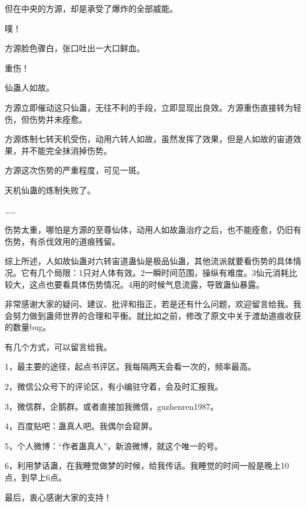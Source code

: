 \begin{this_body}
但在中央的方源，却是承受了爆炸的全部威能。

噗！

方源脸色骤白，张口吐出一大口鲜血。

重伤！

仙蛊人如故。

方源立即催动这只仙蛊，无往不利的手段，立即显现出良效。方源重伤直接转为轻伤，但伤势并未痊愈。

方源炼制七转天机受伤，动用六转人如故，虽然发挥了效果，但是人如故的宙道效果，并不能完全抹消掉伤势。

方源这次伤势的严重程度，可见一斑。

天机仙蛊的炼制失败了。

……

伤势太重，哪怕是方源的至尊仙体，动用人如故蛊治疗之后，也不能痊愈，仍旧有伤势，有杀伐效用的道痕残留。

综上所述，人如故仙蛊对六转宙道蛊仙是极品仙蛊，其他流派就要看伤势的具体情况。它有几个局限：1只对人体有效。2一瞬时间范围，操纵有难度。3仙元消耗比较大，这点也要看具体伤势情况。4用的时候气息流露，导致蛊仙暴露。

非常感谢大家的疑问、建议、批评和指正，若是还有什么问题，欢迎留言给我。我会努力做到蛊师世界的合理和平衡。就比如之前，修改了原文中关于渡劫道痕收获的数量bug。

有几个方式，可以留言给我。

1，最主要的途径，起点书评区。我每隔两天会看一次的，频率最高。

2，微信公众号下的评论区，有小编驻守着，会及时汇报我。

3，微信群，企鹅群。或者直接加我微信，guzhenren1987。

4，百度贴吧：蛊真人吧。我偶尔会窥屏。

5，个人微博：“作者蛊真人”，新浪微博，就这个唯一的号。

6，利用梦话蛊，在我睡觉做梦的时候，给我传话。我睡觉的时间一般是晚上10点，到早上6点。

最后，衷心感谢大家的支持！

\end{this_body}

